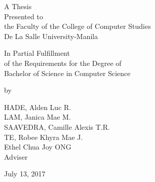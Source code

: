 %
%
%                 

\begin{titlepage}
\centering



\vspace{1.75cm}
A Thesis\\
Presented to\\
the Faculty of the College of Computer Studies\\
De La Salle University-Manila

\vspace{1.75cm}
In Partial Fulfillment\\
of the Requirements for the Degree of\\
Bachelor of  Science in Computer Science

\vspace{1.75cm}
by\\
\vspace{1cm}

HADE, Alden Luc R. \\
LAM, Janica Mae M.  \\
SAAVEDRA, Camille Alexis T.R.  \\
TE, Robee Khyra Mae J. \\

\vspace{1.75cm}
Ethel Chua Joy ONG \\
Adviser

\vspace{1.75cm}
July 13, 2017 \\ %
\end{titlepage}

